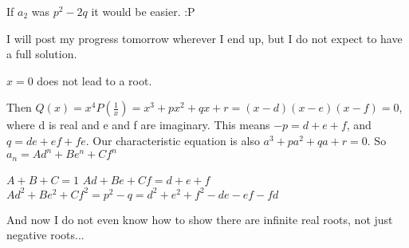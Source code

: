 \begin{solution}
	If $ a_2$ was $ p^2 - 2q$ it would be easier. :P 

I will post my progress tomorrow wherever I end up, but I do not expect to have a full solution.
\end{solution}



\begin{solution}
	$ x = 0$ does not lead to a root.

Then $ Q(x) = x^4P(\frac {1}{x}) = x^3 + px^2 + qx + r = (x - d)(x - e)(x - f) = 0$, where d is real and e and f are imaginary. This means $ - p = d + e + f$, and ${ q = de + ef + fe}$.
Our characteristic equation is also $ a^3 + pa^2 + qa + r = 0$. So $ a_n = Ad^n + Be^n + Cf^n$

$ A + B + C = 1$
$ Ad + Be + Cf = d + e + f$
$ Ad^2 + Be^2 + Cf^2 = p^2 - q = d^2 + e^2 + f^2 - de - ef - fd$

And now I do not even know how to show there are infinite real roots, not just negative roots...
\end{solution}



